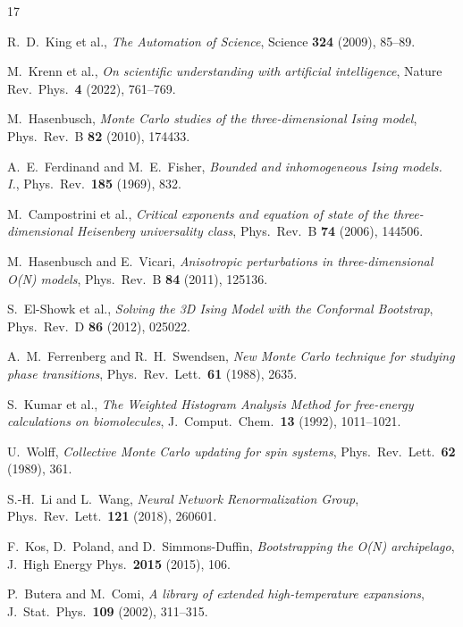 \documentclass[11pt,a4paper]{article}
\begin{document}
\begin{thebibliography}{17}

R.~D.~King et al.,
\textit{The Automation of Science},
Science \textbf{324} (2009), 85--89.

M.~Krenn et al.,
\textit{On scientific understanding with artificial intelligence},
Nature Rev.\ Phys.\ \textbf{4} (2022), 761--769.

M.~Hasenbusch,
\textit{Monte Carlo studies of the three-dimensional Ising model},
Phys.\ Rev.\ B \textbf{82} (2010), 174433.

A.~E.~Ferdinand and M.~E.~Fisher,
\textit{Bounded and inhomogeneous Ising models. I.},
Phys.\ Rev.\ \textbf{185} (1969), 832.

M.~Campostrini et al.,
\textit{Critical exponents and equation of state of the three-dimensional Heisenberg universality class},
Phys.\ Rev.\ B \textbf{74} (2006), 144506.

M.~Hasenbusch and E.~Vicari,
\textit{Anisotropic perturbations in three-dimensional O(N) models},
Phys.\ Rev.\ B \textbf{84} (2011), 125136.

S.~El-Showk et al.,
\textit{Solving the 3D Ising Model with the Conformal Bootstrap},
Phys.\ Rev.\ D \textbf{86} (2012), 025022.

A.~M.~Ferrenberg and R.~H.~Swendsen,
\textit{New Monte Carlo technique for studying phase transitions},
Phys.\ Rev.\ Lett.\ \textbf{61} (1988), 2635.

S.~Kumar et al.,
\textit{The Weighted Histogram Analysis Method for free-energy calculations on biomolecules},
J.\ Comput.\ Chem.\ \textbf{13} (1992), 1011--1021.

U.~Wolff,
\textit{Collective Monte Carlo updating for spin systems},
Phys.\ Rev.\ Lett.\ \textbf{62} (1989), 361.

S.-H.~Li and L.~Wang,
\textit{Neural Network Renormalization Group},
Phys.\ Rev.\ Lett.\ \textbf{121} (2018), 260601.

F.~Kos, D.~Poland, and D.~Simmons-Duffin,
\textit{Bootstrapping the O(N) archipelago},
J.\ High Energy Phys.\ \textbf{2015} (2015), 106.

P.~Butera and M.~Comi,
\textit{A library of extended high-temperature expansions},
J.\ Stat.\ Phys.\ \textbf{109} (2002), 311--315.


\end{thebibliography}
\end{document}
